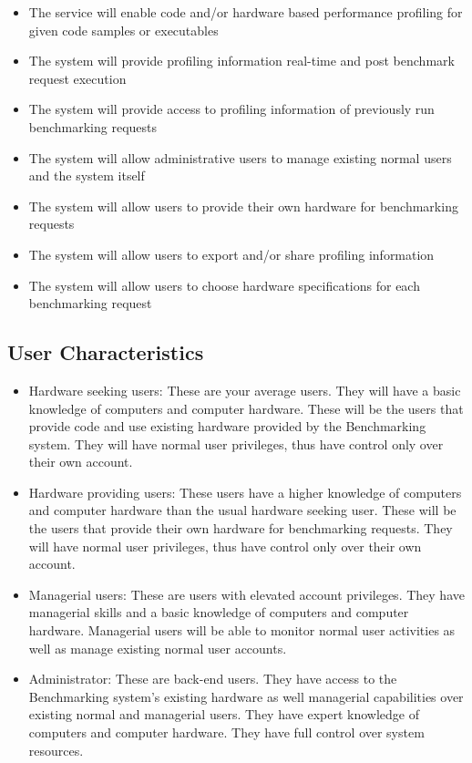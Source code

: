 \documentclass{article}
\begin{document}
    \begin{itemize}
        		\item The service will enable code and/or hardware based performance profiling for given code samples or executables 
                \item The system will provide profiling information real-time and post benchmark request execution
                \item The system will provide access to profiling information of previously run benchmarking requests
                \item The system will allow administrative users to manage existing normal users and the system itself 
              	\item The system will allow users to provide their own hardware for benchmarking requests 
                \item The system will allow users to export and/or share profiling information
                \item The system will allow users to choose hardware specifications for each benchmarking request
    \end{itemize}
    
	\subsection{User Characteristics}
     \begin{itemize}       		
                \item Hardware seeking users: These are your average users. They will have a basic knowledge of computers and computer hardware. These will be the users that provide code and use existing hardware provided by the Benchmarking system. They will have normal user privileges, thus have control only over their own account. 
                \item Hardware providing users: These users have a higher knowledge of computers and computer hardware than the usual hardware seeking user. These will be the users that provide their own hardware for benchmarking requests. They will have normal user privileges, thus have control only over their own account. 
                \item Managerial users: These are users with elevated account privileges. They have managerial skills and a basic knowledge of computers and computer hardware. Managerial users will be able to monitor normal user activities as well as manage existing normal user accounts.
                \item Administrator: These are back-end users. They have access to the Benchmarking system's existing hardware as well managerial capabilities over existing normal and managerial users. They have expert knowledge of computers and computer hardware. They have full control over system resources. 
    \end{itemize}
\end{document}
